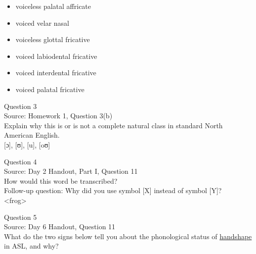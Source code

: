\documentclass[12pt]{article}
\begin{document}
\begin{itemize} \item voiceless palatal affricate \item voiced velar nasal \item voiceless glottal fricative \item voiced labiodental fricative \item voiced interdental fricative \item voiced palatal fricative \end{itemize}


\newpage

{\large Question 3}\\

Source: Homework 1, Question 3(b)\\

Explain why this is or is not a complete natural class in standard North American English.\\

{[ɔ]}, {[ʊ]}, {[u]}, {[oʊ]}


\newpage

{\large Question 4}\\

Source: Day 2 Handout, Part I, Question 11\\

How would this word be transcribed?\\ Follow-up question: Why did you use symbol [X] instead of symbol [Y]?\\

<frog>


\newpage

{\large Question 5}\\

Source: Day 6 Handout, Question 11\\

What do the two signs below tell you about the phonological status of \underline{handshape} in ASL, and why?\\
\end{document}
